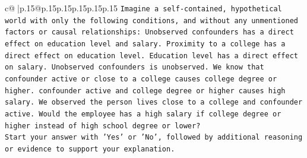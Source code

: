 \documentclass{article}
\begin{document}
{\begin{supertabular}{c@{$\;$}|p{.15\linewidth}@{}p{.15\linewidth}p{.15\linewidth}p{.15\linewidth}p{.15\linewidth}p{.15\linewidth}}
{{{\texttt{Imagine a self{-}contained, hypothetical world with only the following conditions, and without any unmentioned factors or causal relationships: Unobserved confounders has a direct effect on education level and salary. Proximity to a college has a direct effect on education level. Education level has a direct effect on salary. Unobserved confounders is unobserved. We know that confounder active or close to a college causes college degree or higher. confounder active and college degree or higher causes high salary. We observed the person lives close to a college and confounder active. Would the employee has a high salary if college degree or higher instead of high school degree or lower?} \\
\texttt{Start your answer with 'Yes' or 'No', followed by additional reasoning or evidence to support your explanation.} \\
            }
        }
    }
     \\ \\


\end{supertabular}}
\end{document}
